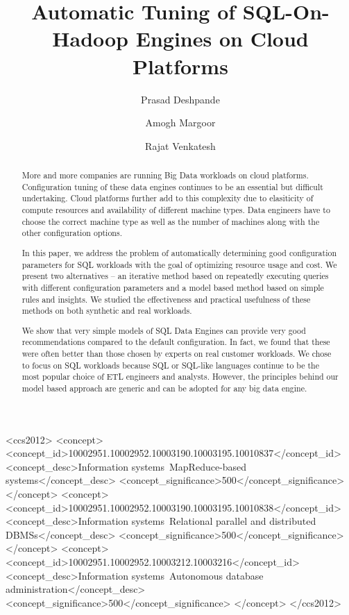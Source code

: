 \documentclass[sigconf]{acmart}
\begin{document}
\title{Automatic Tuning of SQL-On-Hadoop Engines on Cloud Platforms}

\author{Prasad Deshpande}

\author{Amogh Margoor}

\author{Rajat Venkatesh}

\renewcommand{\shortauthors}{P. Deshpande et al.}


\begin{abstract}
More and more companies are running Big Data workloads on cloud platforms. Configuration tuning of these data engines continues to be an essential but difficult undertaking. Cloud platforms further add to this complexity due to elasiticity of compute resources and availability of different machine types. Data engineers have to choose the correct machine type as well as the number of machines along with the other configuration options.

In this paper, we address the problem of automatically determining good configuration parameters for SQL workloads with the goal of optimizing resource usage and cost. We present two alternatives -- an iterative method based on repeatedly executing queries with different configuration parameters and a model based method based on simple rules and insights. We studied the effectiveness and practical usefulness of these methods on both synthetic and real workloads.

We show that very simple models of SQL Data Engines can provide very good recommendations compared to the default configuration. In fact, we found that these were often better than those chosen by experts on real customer workloads. We chose to focus on SQL workloads because SQL or SQL-like languages continue to be the most popular choice of ETL engineers and analysts.  However, the principles behind our model based approach are generic and can be adopted for any big data engine. 
\end{abstract}

\begin{CCSXML}
<ccs2012>
<concept>
<concept_id>10002951.10002952.10003190.10003195.10010837</concept_id>
<concept_desc>Information systems~MapReduce-based systems</concept_desc>
<concept_significance>500</concept_significance>
</concept>
<concept>
<concept_id>10002951.10002952.10003190.10003195.10010838</concept_id>
<concept_desc>Information systems~Relational parallel and distributed DBMSs</concept_desc>
<concept_significance>500</concept_significance>
</concept>
<concept>
<concept_id>10002951.10002952.10003212.10003216</concept_id>
<concept_desc>Information systems~Autonomous database administration</concept_desc>
<concept_significance>500</concept_significance>
</concept>
</ccs2012>
\end{CCSXML}
\end{document}
